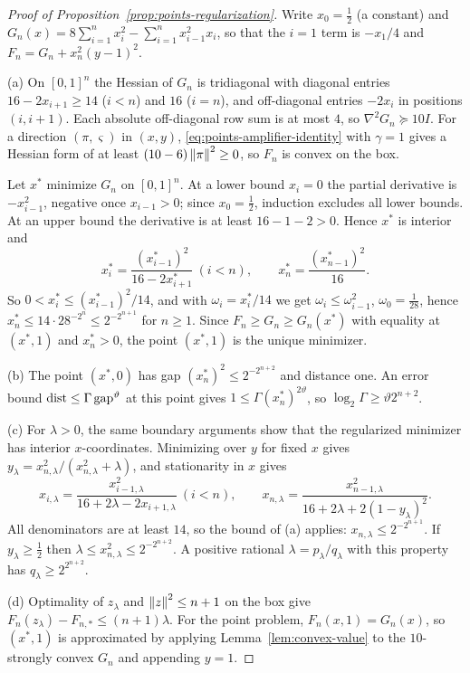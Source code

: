 \begin{proof}[Proof of Proposition~\ref{prop:points-regularization}]
Write $x_0=\frac12$ (a constant) and
$G_n(x)=8\sum_{i=1}^nx_i^2-\sum_{i=1}^nx_{i-1}^2x_i$, so that the $i=1$ term
is $-x_1/4$ and $F_n=G_n+x_n^2(y-1)^2$.

(a) On $[0,1]^n$ the Hessian of $G_n$ is tridiagonal with diagonal entries
$16-2x_{i+1}\ge14$ ($i<n$) and $16$ ($i=n$), and off-diagonal entries
$-2x_i$ in positions $(i,i+1)$. Each absolute off-diagonal row sum is at
most $4$, so $\nabla^2G_n\succeq10I$. For a direction $(\pi,\varsigma)$ in
$(x,y)$, \eqref{eq:points-amplifier-identity} with $\gamma=1$ gives a Hessian
form of at least $(10-6)\left\lVert\pi\right\rVert^2\ge0$, so $F_n$ is convex on the box.

Let $x^*$ minimize $G_n$ on $[0,1]^n$. At a lower bound $x_i=0$ the partial
derivative is $-x_{i-1}^2$, negative once $x_{i-1}>0$; since $x_0=\frac12$,
induction excludes all lower bounds. At an upper bound the derivative is at
least $16-1-2>0$. Hence $x^*$ is interior and
\[
 x_i^*=\frac{(x_{i-1}^*)^2}{16-2x_{i+1}^*}\ (i<n),\qquad
 x_n^*=\frac{(x_{n-1}^*)^2}{16}.
\]
So $0<x_i^*\le(x_{i-1}^*)^2/14$, and with $\omega_i=x_i^*/14$ we get
$\omega_i\le\omega_{i-1}^2$, $\omega_0=\frac1{28}$, hence
$x_n^*\le14\cdot28^{-2^n}\le2^{-2^{n+1}}$ for $n\ge1$. Since
$F_n\ge G_n\ge G_n(x^*)$ with equality at $(x^*,1)$ and $x_n^*>0$, the
point $(x^*,1)$ is the unique minimizer.

(b) The point $(x^*,0)$ has gap $(x_n^*)^2\le2^{-2^{n+2}}$ and distance one.
An error bound $\operatorname{dist}\le\Gamma\,\mathrm{gap}^\vartheta$ at this point gives
$1\le\Gamma(x_n^*)^{2\vartheta}$, so $\log_2\Gamma\ge\vartheta2^{n+2}$.

(c) For $\lambda>0$, the same boundary arguments show that the regularized
minimizer has interior $x$-coordinates. Minimizing over $y$ for fixed $x$
gives $y_\lambda=x_{n,\lambda}^2/(x_{n,\lambda}^2+\lambda)$, and stationarity
in $x$ gives
\[
 x_{i,\lambda}=\frac{x_{i-1,\lambda}^2}{16+2\lambda-2x_{i+1,\lambda}}\
 (i<n),\qquad
 x_{n,\lambda}=\frac{x_{n-1,\lambda}^2}{16+2\lambda+2(1-y_\lambda)^2}.
\]
All denominators are at least $14$, so the bound of (a) applies:
$x_{n,\lambda}\le2^{-2^{n+1}}$. If $y_\lambda\ge\frac12$ then
$\lambda\le x_{n,\lambda}^2\le2^{-2^{n+2}}$. A positive rational
$\lambda=p_\lambda/q_\lambda$ with this property has
$q_\lambda\ge2^{2^{n+2}}$.

(d) Optimality of $z_\lambda$ and $\left\lVert z\right\rVert^2\le n+1$ on the box give
$F_n(z_\lambda)-F_{n,*}\le(n+1)\lambda$. For the point problem,
$F_n(x,1)=G_n(x)$, so $(x^*,1)$ is approximated by applying
Lemma~\ref{lem:convex-value} to the $10$-strongly convex $G_n$ and appending
$y=1$.
\end{proof}

